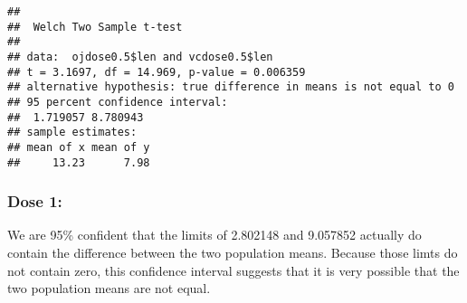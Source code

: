 \documentclass[]{article}
\newenvironment{Shaded}{\begin{snugshade}}{\end{snugshade}}
\newcommand{\KeywordTok}[1]{\textcolor[rgb]{0.13,0.29,0.53}{\textbf{{#1}}}}
\newcommand{\FloatTok}[1]{\textcolor[rgb]{0.00,0.00,0.81}{{#1}}}
\newcommand{\StringTok}[1]{\textcolor[rgb]{0.31,0.60,0.02}{{#1}}}
\newcommand{\NormalTok}[1]{{#1}}
\begin{document}
\begin{Shaded}
\end{Shaded}

\begin{verbatim}
## 
##  Welch Two Sample t-test
## 
## data:  ojdose0.5$len and vcdose0.5$len
## t = 3.1697, df = 14.969, p-value = 0.006359
## alternative hypothesis: true difference in means is not equal to 0
## 95 percent confidence interval:
##  1.719057 8.780943
## sample estimates:
## mean of x mean of y 
##     13.23      7.98
\end{verbatim}

\subsubsection{Dose 1:}\label{dose-1}

We are 95\% confident that the limits of 2.802148 and 9.057852 actually
do contain the difference between the two population means. Because
those limts do not contain zero, this confidence interval suggests that
it is very possible that the two population means are not equal.

\begin{Shaded}
\end{Shaded}
\end{document}
